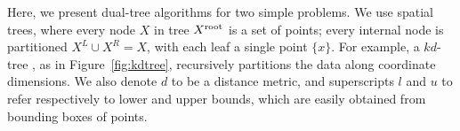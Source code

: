 \documentclass{article}
\newcommand{\spos}{^{{\scriptscriptstyle +\!}}}
\newcommand{\sneg}{^{{\scriptscriptstyle -\!}}}
\newcommand{\kdroot}[1]{#1^{\text{\rm root}}}
\newcommand{\kdleft}[1]{#1^{\!L}}
\newcommand{\kdright}[1]{#1^{\!R}}
\newcommand{\al}{a^l}
\newcommand{\au}{a^u}
\newcommand{\dl}{d^l}
\newcommand{\du}{d^u}
\newcommand{\x}{\\ \hspace{0.13in} \scriptstyle}
\newcommand{\xx}{\\ \hspace{0.26in} \scriptstyle}
\begin{document}
\begin{figure}
\begin{minipage}{3.88in}
  \end{minipage}
  \vspace{-.2in}
\end{figure}
Here, we present dual-tree algorithms for two simple problems.
We use spatial trees, where every node $X$ in tree $\kdroot{X}$ is a set of points; every internal node is partitioned $\kdleft{X} \cup \kdright{X} = X$, with each leaf a single point $\{x\}$.
For example, a $kd$-tree \cite{kde-uai-dong}, as in Figure~\ref{fig:kdtree}, recursively partitions the data along coordinate dimensions.
We also denote $d$ to be a distance metric, and superscripts $l$ and $u$ to refer respectively to lower and upper bounds, which are easily obtained from bounding boxes of points.
\end{document}
